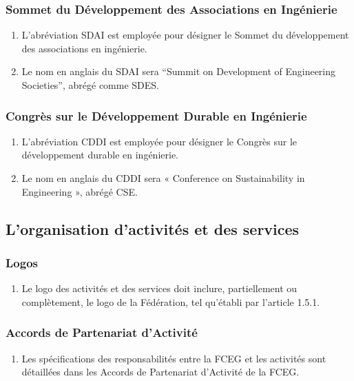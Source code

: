 \subsubsection{Sommet du Développement des Associations en Ingénierie}
\label{sommet-du-developpement-des-associations-en-ingenierie}
\begin{enumerate}
 \item L’abréviation SDAI est employée pour désigner le Sommet du développement des associations en ingénierie.
 \item Le nom en anglais du SDAI sera “Summit on Development of Engineering Societies”, abrégé comme SDES.
\end{enumerate}

\subsubsection{Congrès sur le Développement Durable en Ingénierie}
\label{congres-sur-le-developpement-durable-en-ingenierie}
\begin{enumerate}
 \item L’abréviation CDDI est employée pour désigner le Congrès sur le développement durable en ingénierie.
 \item Le nom en anglais du CDDI sera « Conference on Sustainability in Engineering », abrégé CSE.
\end{enumerate}

\subsection{L'organisation d'activités et des services}
\label{l-organisation-d-activites-et-des-services}
\subsubsection{Logos}
\label{logos}
\begin{enumerate}
 \item Le logo des activités et des services doit inclure, partiellement ou complètement, le logo de la Fédération, tel qu’établi par l’article 1.5.1.
\end{enumerate}

\subsubsection{Accords de Partenariat d'Activité}
\label{accords-de-partenariat-d-activite}
\begin{enumerate}
 \item Les spécifications des responsabilités entre la FCEG et les activités sont détaillées dans les Accords de Partenariat d'Activité de la FCEG.
\end{enumerate}

